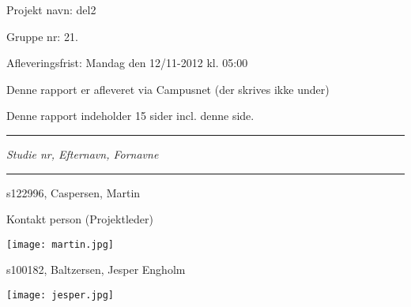 
{\normalsize

\noindent Projekt navn: del2

\noindent Gruppe nr: 21.

\noindent Afleveringsfrist: Mandag den 12/11-2012 kl. 05:00

\noindent Denne rapport er afleveret via Campusnet (der skrives ikke under)

\noindent Denne rapport indeholder 15 sider incl. denne side.
}
\fancybreak{}
\noindent \emph{Studie nr, Efternavn, Fornavne}
\fancybreak{}

\noindent s122996, Caspersen, Martin

\noindent Kontakt person (Projektleder)

\noindent \texttt{[image: martin.jpg]}

\noindent s100182, Baltzersen, Jesper Engholm

\noindent \texttt{[image: jesper.jpg]}